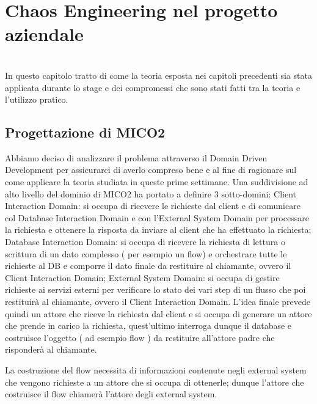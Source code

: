 
\chapter{Chaos Engineering nel progetto aziendale}
\label{cap:analisi-requisiti}

\\
In questo capitolo tratto di come la teoria esposta nei capitoli precedenti sia stata applicata durante lo stage e dei compromessi che sono stati fatti tra la teoria e l'utilizzo pratico.

\section{Progettazione di MICO2}

Abbiamo deciso di analizzare il problema attraverso il Domain Driven Development per assicurarci di averlo compreso bene e al fine di ragionare sul come applicare la teoria studiata in queste prime settimane. 
Una suddivisione ad alto livello del dominio di MICO2 ha portato a definire 3 sotto-domini: Client Interaction Domain: si occupa di ricevere le richieste dal client e di comunicare col Database Interaction Domain e con l’External System Domain per processare la richiesta e ottenere la risposta da inviare al client che ha effettuato la richiesta; 
Database Interaction Domain: si occupa di ricevere la richiesta di lettura o scrittura di un dato complesso ( per esempio un flow) e orchestrare tutte le richieste al DB e comporre il dato finale da restituire al chiamante, ovvero il Client Interaction Domain; 
External System Domain: si occupa di gestire richieste ai servizi esterni per verificare lo stato dei vari step di un flusso che poi restituirà al chiamante, ovvero il Client Interaction Domain. L'idea finale prevede quindi un attore che riceve la richiesta dal client e si occupa di generare un attore che prende in carico la richiesta, quest'ultimo interroga dunque il database e costruisce l'oggetto ( ad esempio flow ) da restituire all'attore padre che risponderà al chiamante.

La costruzione del flow necessita di informazioni contenute negli external system che vengono richieste a un attore che si occupa di ottenerle; 
dunque l'attore che costruisce il flow chiamerà l'attore degli external system.


